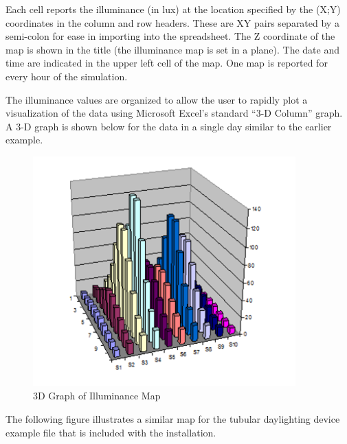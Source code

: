 Each cell reports the illuminance (in lux) at the location specified by the (X;Y) coordinates in the column and row headers. These are XY pairs separated by a semi-colon for ease in importing into the spreadsheet. The Z coordinate of the map is shown in the title (the illuminance map is set in a plane). The date and time are indicated in the upper left cell of the map. One map is reported for every hour of the simulation.

The illuminance values are organized to allow the user to rapidly plot a visualization of the data using Microsoft Excel's standard ``3-D Column'' graph. A 3-D graph is shown below for the data in a single day similar to the earlier example.

\begin{figure}[hbtp] %
\centering
\includegraphics[width=0.9\textwidth, height=0.9\textheight, keepaspectratio=true]{media/image020.png}
\caption{3D Graph of Illuminance Map \protect \label{fig:3d-graph-of-illuminance-map}}
\end{figure}

The following figure illustrates a similar map for the tubular daylighting device example file that is included with the installation.

